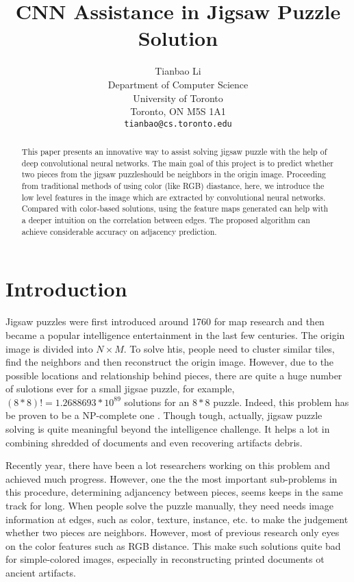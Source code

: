 \documentclass{article}
\title{CNN Assistance in Jigsaw Puzzle Solution}
\author{Tianbao Li\\
  Department of Computer Science\\
  University of Toronto\\
  Toronto, ON M5S 1A1 \\
  \texttt{tianbao@cs.toronto.edu} \\
}
\begin{document}

\maketitle

\begin{abstract}

This paper presents an innovative way to assist solving jigsaw puzzle with the help of deep convolutional neural networks. The main goal of this project is to predict whether two pieces from the jigsaw puzzleshould be neighbors in the origin image. Proceeding from traditional methods of using color (like RGB) diastance, here, we introduce the low level features in the image which are extracted by convolutional neural networks. Compared with color-based solutions, using the feature maps generated can help with a deeper intuition on the correlation between edges. The proposed algorithm can achieve considerable accuracy on adjacency prediction.

\end{abstract}

\section{Introduction}

Jigsaw puzzles were first introduced around 1760 for map research and then became a popular intelligence entertainment \cite{freeman1964apictorial} in the last few centuries. The origin image is divided into $N\times M$. To solve htis, people need to cluster similar tiles, find the neighbors and then reconstruct the origin image. However, due to the possible locations and relationship behind pieces, there are quite a huge number of sulotions ever for a small jigsae puzzle, for example, $(8*8)!=1.2688693*10^{89}$ solutions for an $8*8$ puzzle. Indeed, this problem has be proven to be a NP-complete one \cite{altman1989solving,demaine2007jigsaw}. Though tough, actually, jigsaw puzzle solving is quite meaningful beyond the intelligence challenge. It helps a lot in combining shredded of documents \cite{levin1975computer,marques2009reconstructing} and even recovering artifacts debris\cite{koller2006computer}.

Recently year, there have been a lot researchers working on this problem and achieved much progress. However, one the the most important sub-problems in this procedure, determining adjancency between pieces, seems keeps in the same track for long. When people solve the puzzle manually, they need needs image information at edges, such as color, texture, instance, etc. to make the judgement whether two pieces are neighbors. However, most of previous research only eyes on the color features such as RGB distance. This make such solutions quite bad for simple-colored images, especially in reconstructing printed documents ot ancient artifacts.
\end{document}
